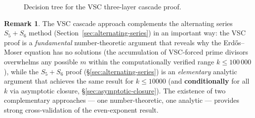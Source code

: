 \documentclass[12pt,a4paper]{article}
\theoremstyle{plain}
\theoremstyle{definition}
\newtheorem{remark}[theorem]{Remark}
\begin{document}
\begin{figure}[htbp]
\centering
{}
\caption{Decision tree for the VSC three-layer cascade proof.}
\label{fig:vsc-flow}
\end{figure}

\begin{remark}
  The VSC cascade approach complements the alternating series
  $S_5+S_6$ method (Section~\ref{sec:alternating-series}) in an
  important way: the VSC proof is a \emph{fundamental} number-theoretic
  argument that reveals why the Erd\H{o}s--Moser equation has no solutions
  (the accumulation of VSC-forced prime divisors overwhelms any possible
  $m$ within the computationally verified range $k \le 100\,000$),
  while the $S_5+S_6$ proof (\S\ref{sec:alternating-series}) is an
  \emph{elementary} analytic argument that achieves the same result
  for $k \le 10000$ (and \textbf{conditionally} for all $k$ via asymptotic
  closure, \S\ref{sec:asymptotic-closure}).
  The existence of two complementary approaches --- one
  number-theoretic, one analytic --- provides strong cross-validation
  of the even-exponent result.
\end{remark}

\end{document}
